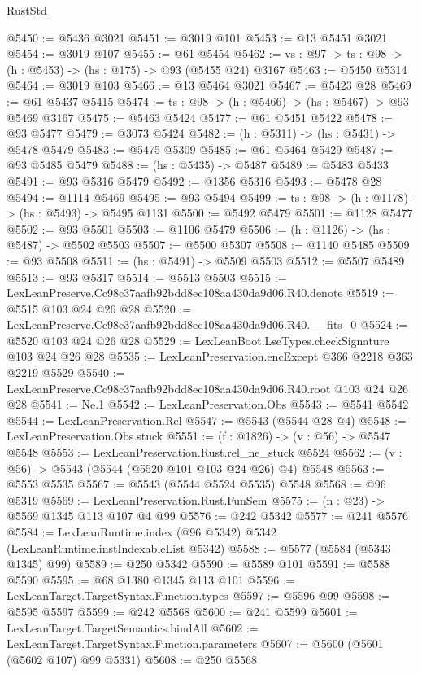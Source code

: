 \begin{lexlean}{RustStd}
\begin{coremodule}
@5450 := @5436 @3021
@5451 := @3019 @101
@5453 := @13 @5451 @3021
@5454 := @3019 @107
@5455 := @61 @5454
@5462 := {vs : @97} -> {ts : @98} -> (h : @5453) -> (hs : @175) -> @93 (@5455 @24) @3167
@5463 := @5450 @5314
@5464 := @3019 @103
@5466 := @13 @5464 @3021
@5467 := @5423 @28
@5469 := @61 @5437 @5415
@5474 := {ts : @98} -> (h : @5466) -> (hs : @5467) -> @93 @5469 @3167
@5475 := @5463 @5424
@5477 := @61 @5451 @5422
@5478 := @93 @5477
@5479 := @3073 @5424
@5482 := (h : @5311) -> (hs : @5431) -> @5478 @5479
@5483 := @5475 @5309
@5485 := @61 @5464 @5429
@5487 := @93 @5485 @5479
@5488 := (hs : @5435) -> @5487
@5489 := @5483 @5433
@5491 := @93 @5316 @5479
@5492 := @1356 @5316
@5493 := @5478 @28
@5494 := @1114 @5469
@5495 := @93 @5494
@5499 := {ts : @98} -> (h : @1178) -> (hs : @5493) -> @5495 @1131
@5500 := @5492 @5479
@5501 := @1128 @5477
@5502 := @93 @5501
@5503 := @1106 @5479
@5506 := (h : @1126) -> (hs : @5487) -> @5502 @5503
@5507 := @5500 @5307
@5508 := @1140 @5485
@5509 := @93 @5508
@5511 := (hs : @5491) -> @5509 @5503
@5512 := @5507 @5489
@5513 := @93 @5317
@5514 := @5513 @5503
@5515 := LexLeanPreserve.Cc98c37aafb92bdd8ec108aa430da9d06.R40.denote
@5519 := @5515 @103 @24 @26 @28
@5520 := LexLeanPreserve.Cc98c37aafb92bdd8ec108aa430da9d06.R40.__fits_0
@5524 := @5520 @103 @24 @26 @28
@5529 := LexLeanBoot.LseTypes.checkSignature @103 @24 @26 @28
@5535 := LexLeanPreservation.encExcept @366 @2218 @363 @2219 @5529
@5540 := LexLeanPreserve.Cc98c37aafb92bdd8ec108aa430da9d06.R40.root @103 @24 @26 @28
@5541 := Ne.{1}
@5542 := LexLeanPreservation.Obs
@5543 := @5541 @5542
@5544 := LexLeanPreservation.Rel
@5547 := @5543 (@5544 @28 @4)
@5548 := LexLeanPreservation.Obs.stuck
@5551 := (f : @1826) -> (v : @56) -> @5547 @5548
@5553 := LexLeanPreservation.Rust.rel_ne_stuck @5524
@5562 := (v : @56) -> @5543 (@5544 (@5520 @101 @103 @24 @26) @4) @5548
@5563 := @5553 @5535
@5567 := @5543 (@5544 @5524 @5535) @5548
@5568 := @96 @5319
@5569 := LexLeanPreservation.Rust.FunSem
@5575 := (n : @23) -> @5569 @1345 @113 @107 @4 @99
@5576 := @242 @5342
@5577 := @241 @5576
@5584 := LexLeanRuntime.index (@96 @5342) @5342 (LexLeanRuntime.instIndexableList @5342)
@5588 := @5577 (@5584 (@5343 @1345) @99)
@5589 := @250 @5342
@5590 := @5589 @101
@5591 := @5588 @5590
@5595 := @68 @1380 @1345 @113 @101
@5596 := LexLeanTarget.TargetSyntax.Function.types
@5597 := @5596 @99
@5598 := @5595 @5597
@5599 := @242 @5568
@5600 := @241 @5599
@5601 := LexLeanTarget.TargetSemantics.bindAll
@5602 := LexLeanTarget.TargetSyntax.Function.parameters
@5607 := @5600 (@5601 (@5602 @107) @99 @5331)
@5608 := @250 @5568

\end{coremodule}
\end{lexlean}
